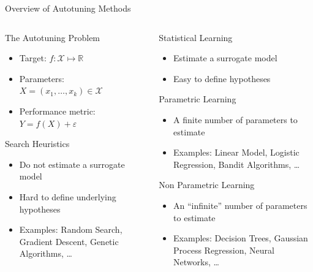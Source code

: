 \documentclass[10pt, compress, aspectratio=169, xcolor={table,usenames,dvipsnames}]{beamer}
\begin{document}
\begin{frame}[label={sec:orge0f55d8}]{Overview of Autotuning Methods}
\begin{columns}
\begin{column}{0.5\columnwidth}
\begin{block}{The Autotuning Problem}
\begin{itemize}
\item Target: \(f: \mathcal{X} \mapsto \mathbb{R}\)
\item Parameters: \(X = (x_1,\dots,x_k) \in \mathcal{X}\)
\item Performance metric: \(Y = f(X) + \varepsilon\)
\end{itemize}
\begin{block}{Search Heuristics}
\begin{itemize}
\item Do not estimate a surrogate model
\item Hard to define underlying hypotheses
\item Examples: Random Search, Gradient Descent, Genetic Algorithms, \dots{}
\end{itemize}
\end{block}
\end{block}
\end{column}
\begin{column}{0.5\columnwidth}
\begin{block}{Statistical Learning}
\begin{itemize}
\item Estimate a surrogate model
\item Easy to define hypotheses
\end{itemize}
\begin{block}{Parametric Learning}
\begin{itemize}
\item A finite number of parameters to estimate
\item Examples: Linear Model, Logistic Regression, Bandit Algorithms, \dots{}
\end{itemize}
\end{block}
\begin{block}{Non Parametric Learning}
\begin{itemize}
\item An ``infinite'' number of parameters to estimate
\item Examples: Decision Trees, Gaussian Process Regression, Neural Networks, \dots{}
\end{itemize}
\end{block}
\end{block}
\end{column}
\end{columns}
\end{frame}
\end{document}
